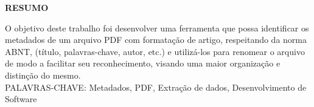 \begin{center}
\textbf{RESUMO}
\end{center}
\singlespacing

\noindent 
	O objetivo deste trabalho foi desenvolver uma ferramenta que possa identificar os metadados de um arquivo PDF com formatação de artigo, respeitando da norma ABNT, (título, palavras-chave, autor, etc.) e utilizá-los para renomear o arquivo de modo a facilitar seu reconhecimento, visando uma maior organização e distinção do mesmo.
 \\
\noindent PALAVRAS-CHAVE: Metadados, PDF, Extração de dados, Desenvolvimento de Software
